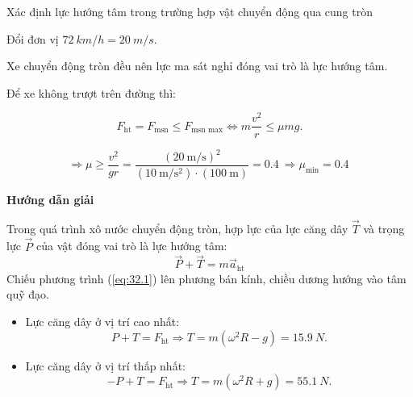 \begin{dang}{Xác định lực hướng tâm trong trường hợp vật chuyển động qua cung tròn}
{		Đổi đơn vị $\SI{72}{km/h}=\SI{20}{m/s}$.
		
		Xe chuyển động tròn đều nên lực ma sát nghỉ đóng vai trò là lực hướng tâm.
		
		Để xe không trượt trên đường thì:
		
		$$F_\text{ht} = F_\text{msn}\le F_\text{msn max} \Leftrightarrow m\dfrac{v^2}{r} \leq \mu mg.$$
		
		$$\Rightarrow \mu \geq \dfrac{v^2}{gr} =\dfrac{\left(\SI{20}{\meter/\second}\right)^2}{\left(\SI{10}{\meter/\second^2}\right)\cdot\left(\SI{100}{\meter}\right)}= \SI{0,4}{}\Rightarrow \mu_\text{min} =\SI{0,4}{}$$
	}
	{	\begin{center}
			\textbf{Hướng dẫn giải}
		\end{center}
	\begin{minipage}[l]{0.65\textwidth}
		Trong quá trình xô nước chuyển động tròn, hợp lực của lực căng dây $\vec T$ và trọng lực  $\vec P$ của vật đóng vai trò là lực hướng tâm:
		\begin{equation}
			\label{eq:32.1}
			\vec P+\vec T=m\vec a_\text{ht}
		\end{equation}
		Chiếu phương trình (\ref{eq:32.1}) lên phương bán kính, chiều dương hướng vào tâm quỹ đạo.
		\begin{itemize}
			\item Lực căng dây ở vị trí cao nhất:
			\begin{equation*}
				P+T =F_{\text{ht}} \Rightarrow T = m(\omega^2R -g)=\SI{15,9}{N}.
			\end{equation*}
			\item Lực căng dây ở vị trí thấp nhất: 
			\begin{equation*}
				-P+T =F_{\text{ht}} \Rightarrow T = m(\omega^2R +g)=\SI{55,1}{N}.
			\end{equation*}
		\end{itemize}
	\end{minipage}
\begin{minipage}[l]{0.3\textwidth}
	\begin{center}

\end{center}
\end{minipage}}
\end{dang}
